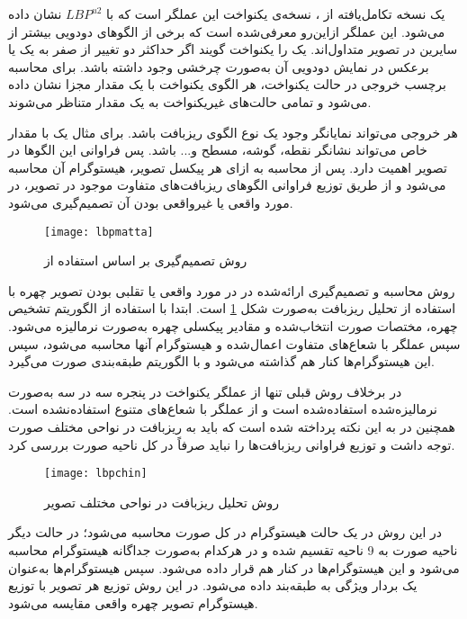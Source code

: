 یک نسخه تکامل‌یافته از ، نسخه‌ی یکنواخت این عملگر است که با 
$LBP^{u2}$
 نشان داده می‌شود. این عملگر از‌این‌رو معرفی‌شده است که برخی از الگوهای دودویی بیشتر از سایرین در تصویر متداول‌اند. یک  را یکنواخت گویند اگر حداکثر دو تغییر از صفر به یک یا برعکس در نمایش دودویی آن به‌صورت چرخشی وجود داشته باشد. برای محاسبه برچسب خروجی در حالت یکنواخت، هر الگوی یکنواخت با یک مقدار مجزا نشان داده می‌شود و تمامی حالت‌های غیر‌یکنواخت به یک مقدار متناظر می‌شوند.

هر خروجی  می‌تواند نمایانگر وجود یک نوع الگوی ریزبافت باشد. برای مثال یک  با مقدار خاص می‌تواند نشانگر نقطه، گوشه، مسطح و... باشد. پس فراوانی این الگوها در تصویر اهمیت دارد. پس از محاسبه  به ازای هر پیکسل تصویر، هیستوگرام آن محاسبه می‌شود و از طریق توزیع فراوانی الگوهای ریزبافت‌های متفاوت موجود در تصویر، در مورد واقعی یا غیر‌واقعی بودن آن تصمیم‌گیری می‌شود.
\begin{figure}[hb]
	\centerline{\texttt{[image: lbpmatta]}}
	\caption{روش تصمیم‌گیری بر اساس استفاده از  \cite{maatta2011face}}
	\label{fig:lbpmatta}
\end{figure}

روش محاسبه و تصمیم‌گیری ارائه‌شده در 
\cite{maatta2011face}
در مورد واقعی یا تقلبی بودن تصویر چهره با استفاده از تحلیل ریزبافت به‌صورت شکل
\ref{fig:lbpmatta}
است.
ابتدا با استفاده از الگوریتم تشخیص چهره، مختصات صورت انتخاب‌شده و مقادیر پیکسلی چهره به‌صورت نرمالیزه می‌شود. سپس عملگر  با شعاع‌های متفاوت اعمال‌شده و هیستوگرام آنها محاسبه می‌شود، سپس این هیستوگرام‌ها کنار هم گذاشته می‌شود و با الگوریتم  طبقه‌بندی صورت می‌گیرد.

در 
\cite{chingovska2012effectiveness}
بر‌خلاف روش قبلی تنها از عملگر  یکنواخت در پنجره سه در سه به‌صورت نرمالیزه‌شده استفاده‌شده است و از عملگر  با شعاع‌های متنوع 
\cite{maatta2011face}
استفاده‌نشده است. همچنین در 
\cite{chingovska2012effectiveness}
به این نکته پرداخته‌ شده است که باید به ریزبافت در نواحی مختلف صورت توجه داشت و توزیع فراوانی ریزبافت‌ها را نباید صرفاً در کل ناحیه صورت بررسی کرد.
\begin{figure}[t]
	\centerline{\texttt{[image: lbpchin]}}
	\caption{روش تحلیل ریزبافت در نواحی مختلف تصویر \cite{chingovska2012effectiveness}}
	\label{fig:lbpchin}
\end{figure}
در این روش در یک حالت هیستوگرام  در کل صورت محاسبه می‌شود؛ در حالت دیگر ناحیه صورت به 9 ناحیه تقسیم شده و در هر‌کدام به‌صورت جداگانه هیستوگرام  محاسبه می‌شود و این هیستوگرام‌ها در کنار هم قرار داده می‌شود. سپس هیستوگرام‌ها به‌عنوان یک بردار ویژگی به طبقه‌بند داده می‌شود. در این روش توزیع هر تصویر با توزیع هیستوگرام تصویر چهره واقعی مقایسه می‌شود.

